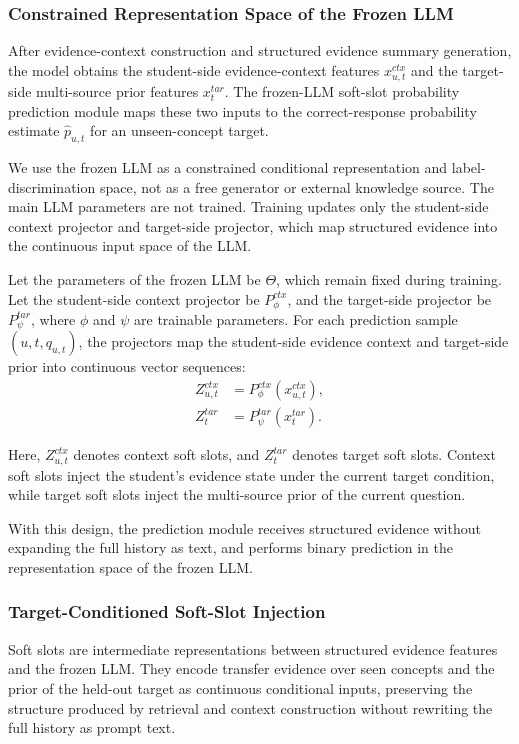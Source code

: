 \documentclass[a4paper,12pt]{article}
\numberwithin{table}{section}
\begin{document}
\subsubsection{Constrained Representation Space of the Frozen LLM}

After evidence-context construction and structured evidence summary generation, the model obtains the student-side evidence-context features \(x^{ctx}_{u,t}\) and the target-side multi-source prior features \(x^{tar}_{t}\). The frozen-LLM soft-slot probability prediction module maps these two inputs to the correct-response probability estimate \(\hat{p}_{u,t}\) for an unseen-concept target.

We use the frozen LLM as a constrained conditional representation and label-discrimination space, not as a free generator or external knowledge source. The main LLM parameters are not trained. Training updates only the student-side context projector and target-side projector, which map structured evidence into the continuous input space of the LLM.

Let the parameters of the frozen LLM be \(\Theta\), which remain fixed during training. Let the student-side context projector be \(P_{\phi}^{ctx}\), and the target-side projector be \(P_{\psi}^{tar}\), where \(\phi\) and \(\psi\) are trainable parameters. For each prediction sample \((u,t,q_{u,t})\), the projectors map the student-side evidence context and target-side prior into continuous vector sequences:
\begin{align}
Z^{ctx}_{u,t} &= P_{\phi}^{ctx}(x^{ctx}_{u,t}), \\
Z^{tar}_{t} &= P_{\psi}^{tar}(x^{tar}_{t}).
\end{align}

Here, \(Z^{ctx}_{u,t}\) denotes context soft slots, and \(Z^{tar}_{t}\) denotes target soft slots. Context soft slots inject the student's evidence state under the current target condition, while target soft slots inject the multi-source prior of the current question.

With this design, the prediction module receives structured evidence without expanding the full history as text, and performs binary prediction in the representation space of the frozen LLM.

\subsubsection{Target-Conditioned Soft-Slot Injection}

Soft slots are intermediate representations between structured evidence features and the frozen LLM. They encode transfer evidence over seen concepts and the prior of the held-out target as continuous conditional inputs, preserving the structure produced by retrieval and context construction without rewriting the full history as prompt text.
\end{document}
